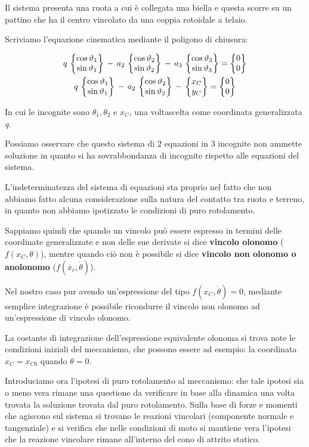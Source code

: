 Il sistema presenta una ruota a cui è collegata una biella e questa scorre su un pattino che ha il centro vincolato da una coppia rotoidale a telaio.

Scriviamo l'equazione cinematica mediante il poligono di chiusura:

\begin{gather*}
q\,\begin{Bmatrix}\cos{\vartheta_1}\\\sin{\vartheta_1}\end{Bmatrix}\,-\,a_2\,\begin{Bmatrix}\cos{\vartheta_2}\\\sin{\vartheta_2}\end{Bmatrix}\,-\,a_3\,\begin{Bmatrix}\cos{\vartheta_3}\\\sin{\vartheta_3}\end{Bmatrix} = \begin{Bmatrix}0\\0\end{Bmatrix}\\
q\,\begin{Bmatrix}\cos{\vartheta_1}\\\sin{\vartheta_1}\end{Bmatrix}\,-\,a_2\,\begin{Bmatrix}\cos{\vartheta_2}\\\sin{\vartheta_2}\end{Bmatrix}\,-\,\begin{Bmatrix}x_C\\y_C\end{Bmatrix} = \begin{Bmatrix}0\\0\end{Bmatrix}
\end{gather*}

In cui le incognite sono $\theta_1, \theta_2$ e $x_C$, una voltascelta come coordinata generalizzata \emph{q}.

Possiamo osservare che questo sistema di 2 equazioni in 3 incognite non ammette soluzione in quanto si ha sovrabbondanza di incognite rispetto alle equazioni del sistema.

L'indeterminatezza del sistema di equazioni sta proprio nel fatto che non abbiamo fatto alcuna considerazione sulla natura del contatto tra ruota e terreno, in quanto non abbiamo ipotizzato le condizioni di puro rotolamento.

Sappiamo quindi che quando un vincolo può essere espresso in termini delle coordinate generalizzate e non delle sue derivate si dice \textbf{vincolo olonomo} ($f(x_C,\theta)$), mentre quando ciò non è possibile si dice \textbf{vincolo non olonomo o anolonomo} ($f(\dot{x_c},\dot{\theta})$).

Nel nostro caso pur avendo un'espressione del tipo $f(\dot{x_C},\dot{\theta}) = 0$, mediante semplice integrazione è possibile ricondurre il vincolo non olonomo ad un'espressione di vincolo olonomo.

La costante di integrazione dell'espressione equivalente olonoma si trova note le condizioni iniziali del meccanismo, che possono essere ad esempio: la coordinata $x_C = x_{C0}$ quando $\theta = 0$.

Introduciamo ora l'ipotesi di puro rotolamento al meccanismo: che tale ipotesi sia o meno vera rimane una questione da verificare in base alla dinamica una volta trovata la soluzione trovata dal puro rotolamento. Sulla base di forze e momenti che agiscono sul sistema si trovano le reazioni vincolari (componente normale e tangenziale) e si verifica che nelle condizioni di moto si mantiene vera l'ipotesi che la reazione vincolare rimane all'interno del cono di attrito statico.

